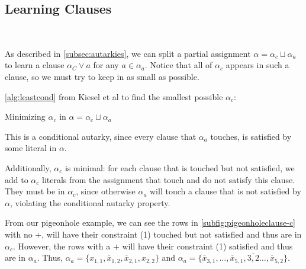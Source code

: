 \subsection{Learning Clauses}~\label{subsec:learning}


As described in \autoref{subsec:autarkies}, we can split a partial assignment $\alpha = \alpha_c \sqcup \alpha_a$ to learn a \pr clause $\alpha_C \lor a$ for any $a \in \alpha_a$. Notice that all of $\alpha_c$ appears in such a clause, so we must try to keep in as small as possible. 


\autoref{alg:leastcond} from Kiesel et al \cite{conditionalautarkies} to find the smallest possible $\alpha_c$:


\begin{algorithm}
    \caption{Minimizing $\alpha_c$ in $\alpha = \alpha_c \sqcup \alpha_a$}\label{alg:leastcond}
    \SetAlgoNoLine

\end{algorithm}

This is a conditional autarky, since every clause that $\alpha_a$ touches, is satisfied by some literal in $\alpha$.

Additionally, $\alpha_c$ is minimal: for each clause that is touched but not satisfied, we add to $\alpha_c$ literals from the assignment that touch and do not satisfy this clause. They must be in $\alpha_c$, since otherwise $\alpha_a$ will touch a clause that is not satisfied by $\alpha$, violating the conditional autarky property.

From our pigeonhole example, we can see the rows in \autoref{subfig:pigeonholeclause-c} with no $+$, will have their constraint (1) touched but not satisfied and thus are in $\alpha_c$. However, the rows with a $+$ will have their constraint (1) satisfied and thus are in $\alpha_a$. Thus, $\alpha_a = \{x_{1, 1}, \overline{x}_{1, 2}, \overline{x}_{2, 1}, x_{2, 2}\}$ and $\alpha_a = \{\overline{x}_{3, 1}, \ldots, \overline{x}_{5, 1}, \overline{3, 2} \ldots, \overline{x}_{5, 2}\}$.

